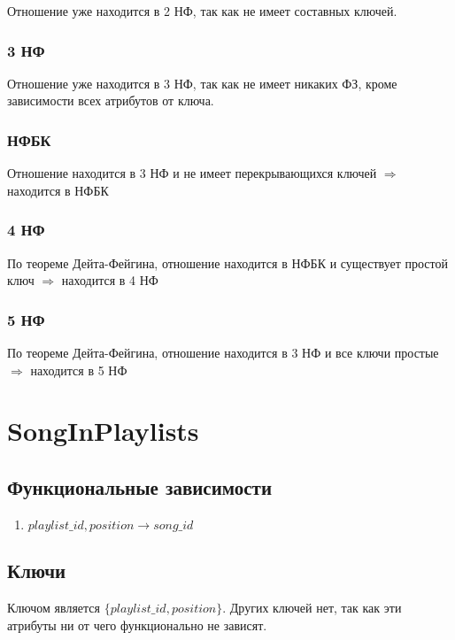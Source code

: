 \documentclass{article}
\begin{document}
Отношение уже находится в 2 НФ, так как не имеет составных ключей.

\subsubsection{3 НФ}

Отношение уже находится в 3 НФ, так как не имеет никаких ФЗ, кроме зависимости всех атрибутов от ключа.

\subsubsection{НФБК}

Отношение находится в 3 НФ и не имеет перекрывающихся ключей $\Rightarrow$ находится в НФБК

\subsubsection{4 НФ}

По теореме Дейта-Фейгина, отношение находится в НФБК и существует простой ключ $\Rightarrow$ находится в 4 НФ

\subsubsection{5 НФ}

По теореме Дейта-Фейгина, отношение находится в 3 НФ и все ключи простые $\Rightarrow$ находится в 5 НФ

\section{SongInPlaylists}

\subsection{Функциональные зависимости}

\begin{enumerate}
	\item $playlist\_id, position \rightarrow song\_id$
\end{enumerate}

\subsection{Ключи}

Ключом является $\{playlist\_id, position\}$. Других ключей нет, так как эти атрибуты ни от чего функционально не зависят.
\end{document}
